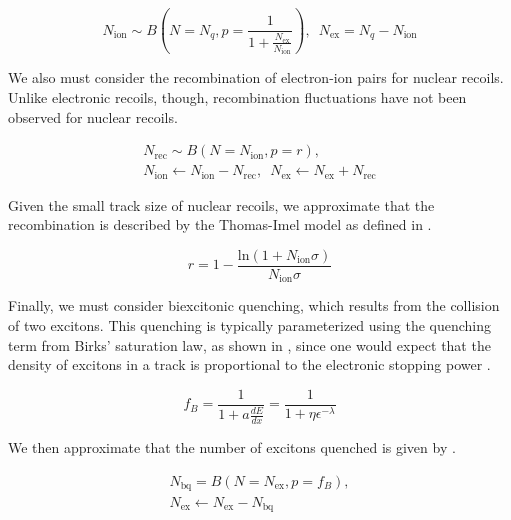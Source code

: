 \begin{equation}
        \label{eqn:xe1t_nr_exciton_ion}
        N_{\textrm{ion}} \sim B \left( N=N_q, p = \frac{1}{1 + \frac{N_{\textrm{ex}}}{N_{\textrm{ion}}}} \right) , \, \, \, N_{\textrm{ex}} = N_q - N_{\textrm{ion}}
\end{equation}


We also must consider the recombination of electron-ion pairs for nuclear recoils.  Unlike electronic recoils, though, recombination fluctuations have not been observed for nuclear recoils.

\begin{equation}
        \label{eqn:xe1t_nr_recombination}
        \begin{gathered}
                N_{\textrm{rec}} \sim B(N = N_{\textrm{ion}}, p = r), \\ 
                N_{\textrm{ion}} \leftarrow N_{\textrm{ion}} - N_{\textrm{rec}}, \, \, \,  N_{\textrm{ex}} \leftarrow N_{\textrm{ex}} + N_{\textrm{rec}}
        \end{gathered}
\end{equation}

Given the small track size of nuclear recoils, we approximate that the recombination is described by the Thomas-Imel model \cite{thomas1987recombination} as defined in .


\begin{equation}
        \label{eqn:xe1t_ti_model}
        r = 1 - \frac{\textrm{ln}(1 + N_{\textrm{ion}} \sigma)}{N_{\textrm{ion}} \sigma}
\end{equation}


Finally, we must consider biexcitonic quenching, which results from the collision of two excitons.  This quenching is typically parameterized using the quenching term from Birks' saturation law, as shown in , since one would expect that the density of excitons in a track is proportional to the electronic stopping power \cite{mei2008model, tretyak2010semi, bezrukov2011interplay}. 

\begin{equation}
        \label{eqn:birks_quenching}
        f_B = \frac{1}{1 + a \frac{dE}{dx}} = \frac{1}{1 + \eta \epsilon^{- \lambda}}
\end{equation}


We then approximate that the number of excitons quenched is given by .

\begin{equation}
        \label{eqn:xe1t_biexcitonic_quenching}
        \begin{gathered}
                N_{\textrm{bq}} = B(N=N_{\textrm{ex}}, p = f_B), \\
                N_{\textrm{ex}} \leftarrow N_{\textrm{ex}} - N_{\textrm{bq}}
        \end{gathered}
\end{equation}


